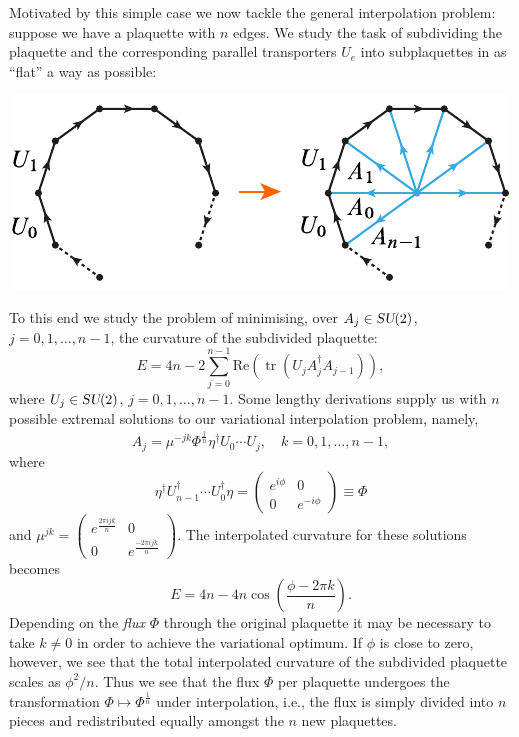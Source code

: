 \documentclass[twocolumn,lengthcheck,superscriptaddress]{revtex4-1}
\newcommand{\tr}{\operatorname{tr}}
\def\su2{\textsl{SU}(2)}
\theoremstyle{definition}
\theoremstyle{remark}
\begin{document}
Motivated by this simple case we now tackle the general interpolation problem: suppose we have a plaquette with $n$ edges. We study the task of subdividing the plaquette and the corresponding parallel transporters $U_e$ into subplaquettes in as ``flat'' a way as possible:
\begin{center}
	\includegraphics{plaquettesubdivision.pdf}
\end{center}
To this end we study the problem of minimising, over $A_j\in \su2$, $j = 0, 1, \ldots, n-1$, the curvature of the subdivided plaquette:
\begin{equation}
	E=4n-2\sum_{j=0}^{n-1} \text{Re}(\tr(U_j A_j^\dag A_{j-1})),
\end{equation}
where $U_j\in \su2$, $j=0, 1, \ldots, n-1$. Some lengthy derivations supply us with  $n$ possible extremal solutions to our variational interpolation problem, namely,
\begin{equation}
	A_j =   \mu^{-jk}\Phi^{\frac{j}{n}}\eta^\dag U_0 \cdots U_{j}, \quad k = 0, 1, \ldots, n-1,
\end{equation}
where
\begin{equation}
	\eta^\dag U_{n-1}^\dag\cdots U_0^\dag \eta = \begin{pmatrix} e^{i\phi} & 0 \\ 0 &  e^{-i\phi}\end{pmatrix}\equiv \Phi
\end{equation}
and $\mu^{jk} = \left(\begin{smallmatrix} e^{\frac{2\pi i jk}{n}} & 0 \\ 0 & e^{\frac{-2\pi i jk}{n}}\end{smallmatrix}\right)$.
The interpolated curvature for these solutions becomes
\begin{equation}
	E = 4n-4n \cos\left(\frac{\phi - 2\pi k}{n}\right).
\end{equation}
Depending on the \emph{flux} $\Phi$ through the original plaquette it may be necessary to take $k\not=0$ in order to achieve the variational optimum. If $\phi$ is close to zero, however, we see that the total interpolated curvature of the subdivided plaquette scales as $\phi^2/n$. Thus we see that the flux $\Phi$ per plaquette undergoes the transformation $\Phi\mapsto \Phi^{\frac{1}{n}}$ under interpolation, i.e., the flux is simply divided into $n$ pieces and redistributed equally amongst the $n$ new plaquettes.
\end{document}
